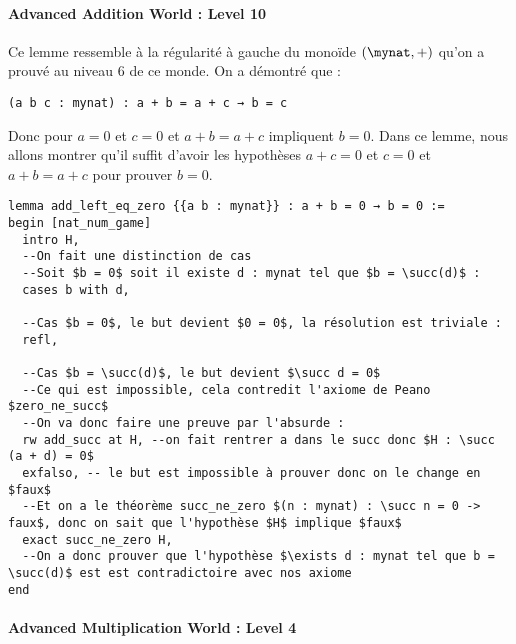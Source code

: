 \paragraph{Advanced Addition World : Level 10}

Ce lemme ressemble à la régularité à gauche du monoïde $(\mynat, +)$ qu'on a prouvé au niveau 6 de ce monde.
On a démontré que :
\begin{verbatim}
(a b c : mynat) : a + b = a + c → b = c
\end{verbatim}
Donc pour $a = 0$ et $c = 0$ et $a + b = a + c$ impliquent $b = 0$.
Dans ce lemme, nous allons montrer qu'il suffit d'avoir les hypothèses $a+c = 0$ et $c = 0$ et $a + b = a + c$ pour prouver $b = 0$.

\begin{verbatim}
lemma add_left_eq_zero {{a b : mynat}} : a + b = 0 → b = 0 :=
begin [nat_num_game]
  intro H,
  --On fait une distinction de cas
  --Soit $b = 0$ soit il existe d : mynat tel que $b = \succ(d)$ :
  cases b with d,

  --Cas $b = 0$, le but devient $0 = 0$, la résolution est triviale :
  refl,

  --Cas $b = \succ(d)$, le but devient $\succ d = 0$
  --Ce qui est impossible, cela contredit l'axiome de Peano $zero_ne_succ$
  --On va donc faire une preuve par l'absurde :
  rw add_succ at H, --on fait rentrer a dans le succ donc $H : \succ (a + d) = 0$
  exfalso, -- le but est impossible à prouver donc on le change en $faux$
  --Et on a le théorème succ_ne_zero $(n : mynat) : \succ n = 0 -> faux$, donc on sait que l'hypothèse $H$ implique $faux$
  exact succ_ne_zero H,
  --On a donc prouver que l'hypothèse $\exists d : mynat tel que b = \succ(d)$ est est contradictoire avec nos axiome
end
\end{verbatim}

\paragraph{Advanced Multiplication World : Level 4}

